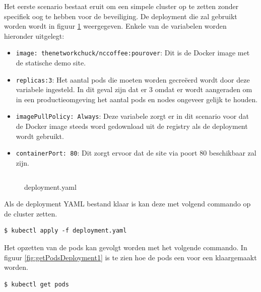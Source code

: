 Het eerste scenario bestaat eruit om een simpele cluster op te zetten zonder specifiek oog te hebben voor de beveiliging. De deployment die zal gebruikt worden wordt in figuur \ref{basicDeploy} weergegeven. Enkele van de variabelen worden hieronder uitgelegt: 
\begin{itemize}
	\item \verb|image: thenetworkchuck/nccoffee:pourover|: Dit is de Docker image met de statische demo site.
	\item \verb|replicas:3|: Het aantal pods die moeten worden gecreëerd wordt door deze variabele ingesteld. In dit geval zijn dat er 3 omdat er wordt aangeraden om in een productieomgeving het aantal pods en nodes ongeveer gelijk te houden.
	\item \verb|imagePullPolicy: Always|: Deze variabele zorgt er in dit scenario voor dat de Docker image steeds word gedownload uit de registry als de deployment wordt gebruikt.
	\item \verb|containerPort: 80|: Dit zorgt ervoor dat de site via poort 80 beschikbaar zal zijn.
\end{itemize}

\begin{figure}[h] 
	\centering
	\inputminted[fontsize=\footnotesize,linenos]{yaml}{files/deployment.yaml}
	\caption{deployment.yaml}
	\label{basicDeploy}
\end{figure}

Als de deployment YAML bestand klaar is kan deze met volgend commando op de cluster zetten.
\begin{verbatim} 
$ kubectl apply -f deployment.yaml
\end{verbatim}
Het opzetten van de pods kan gevolgt worden met het volgende commando. In figuur \ref{fig:getPodsDeployment1} is te zien hoe de pods een voor een klaargemaakt worden.
\begin{verbatim} 
$ kubectl get pods
\end{verbatim}

